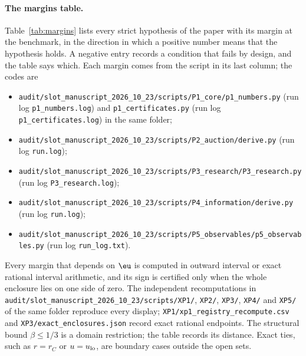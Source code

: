 \paragraph{The margins table.}
Table~\ref{tab:margins} lists every strict hypothesis of the paper with its margin at the benchmark, in the
direction in which a positive number means that the hypothesis holds. A negative entry records a condition that
fails by design, and the table says which. Each margin comes from the script in its last column; the codes are
\begin{itemize}[leftmargin=2em,itemsep=0pt]
\item[{[P1]}] \nolinkurl{audit/slot_manuscript_2026_10_23/scripts/P1_core/p1_numbers.py} (run log
\nolinkurl{p1_numbers.log}) and \nolinkurl{p1_certificates.py} (run log \nolinkurl{p1_certificates.log}) in the same
folder;
\item[{[P2]}] \nolinkurl{audit/slot_manuscript_2026_10_23/scripts/P2_auction/derive.py} (run log \nolinkurl{run.log});
\item[{[P3]}] \nolinkurl{audit/slot_manuscript_2026_10_23/scripts/P3_research/P3_research.py} (run log
\nolinkurl{P3_research.log});
\item[{[P4]}] \nolinkurl{audit/slot_manuscript_2026_10_23/scripts/P4_information/derive.py} (run log \nolinkurl{run.log});
\item[{[P5]}] \nolinkurl{audit/slot_manuscript_2026_10_23/scripts/P5_observables/p5_observables.py} (run log
\nolinkurl{run_log.txt}).
\end{itemize}
Every margin that depends on \(\eu\) is computed in outward interval or exact rational interval arithmetic, and its
sign is certified only when the whole enclosure lies on one side of zero. The independent recomputations in
\nolinkurl{audit/slot_manuscript_2026_10_23/scripts/XP1/}, \nolinkurl{XP2/}, \nolinkurl{XP3/}, \nolinkurl{XP4/} and
\nolinkurl{XP5/} of the same folder reproduce every display; \nolinkurl{XP1/xp1_registry_recompute.csv} and
\nolinkurl{XP3/exact_enclosures.json} record exact rational endpoints. The structural bound \(\beta\le1/3\) is a domain
restriction; the table records its distance. Exact ties, such as \(r=r_C\) or \(u=u_{\rm lo}\), are boundary cases
outside the open sets.

